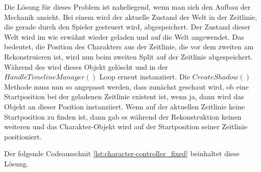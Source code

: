 Die Lösung für dieses Problem ist naheliegend, wenn man sich den Aufbau der Mechanik ansieht. Bei einem  wird der aktuelle Zustand der Welt in der Zeitlinie, die gerade durch den Spieler gesteuert wird, abgespeichert. Der Zustand dieser Welt wird im  wie erwähnt wieder geladen und auf die Welt angewendet. Das bedeutet, die Position des Charakters aus der Zeitlinie, die vor dem zweiten  am Rekonstruieren ist, wird nun beim zweiten Split auf der Zeitlinie abgespeichert. Während des  wird dieses Objekt gelöscht und in der $HandleTimelineManager()$ Loop erneut instanziiert. Die $CreateShadow()$ Methode muss nun so angepasst werden, dass zunächst geschaut wird, ob eine Startposition bei der geladenen Zeitlinie existent ist, wenn ja, dann wird das Objekt an dieser Position instanziiert. Wenn auf der aktuellen Zeitlinie keine Startposition zu finden ist, dann gab es während der Rekonstruktion keinen weiteren  und das Charakter-Objekt wird auf der Startposition seiner Zeitlinie positioniert. 

Der folgende Codeausschnit \ref{lst:character-controller_fixed} beinhaltet diese Lösung.

